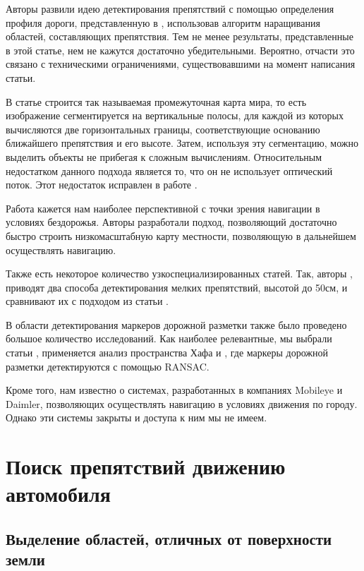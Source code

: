 \documentclass[aps,%
14pt,%
final,%
oneside,
onecolumn,%
musixtex, %
superscriptaddress,%
centertags]{extarticle} %
\begin{document}
Авторы \cite{broggi2006single} развили идею детектирования препятствий с помощью определения профиля дороги, представленную в \cite{labayrade2002real}, использовав алгоритм наращивания областей, составляющих препятствия. Тем не менее результаты, представленные в этой статье, нем не кажутся достаточно убедительными. Вероятно, отчасти это связано с техническими ограничениями, существовавшими на момент написания статьи.

В статье \cite{pfeiffer2010efficient} строится так называемая промежуточная карта мира, то есть изображение сегментируется на вертикальные полосы, для каждой из которых вычисляются две горизонтальных границы, соответствующие основанию ближайшего препятствия и его высоте. Затем, используя эту сегментацию, можно выделить объекты не прибегая к сложным вычислениям. Относительным недостатком данного подхода является то, что он не использует оптический поток. Этот недостаток исправлен в работе \cite{benenson2011stixels}.

Работа \cite{broggi2013terrain} кажется нам наиболее перспективной с точки зрения навигации в условиях бездорожья. Авторы разработали подход, позволяющий достаточно быстро строить низкомасштабную карту местности, позволяющую в дальнейшем осуществлять навигацию.

Также есть некоторое количество узкоспециализированных статей. Так, авторы \cite{pinggera2016lost}, приводят два способа детектирования мелких препятствий, высотой до 50см, и сравнивают их с подходом из статьи \cite{pfeiffer2010efficient}.

В области детектирования маркеров дорожной разметки также было проведено большое количество исследований. Как наиболее релевантные, мы выбрали статьи \cite{song2017real}, применяется анализ пространства Хафа и \cite{aly2008real}, где маркеры дорожной разметки детектируются с помощью RANSAC. 

Кроме того, нам известно о системах, разработанных в компаниях Mobileye и Daimler, позволяющих осуществлять навигацию в условиях движения по городу. Однако эти системы закрыты и доступа к ним мы не имеем.

\section {Поиск препятствий движению автомобиля }

\subsection{Выделение областей, отличных от поверхности земли }
\end{document}
